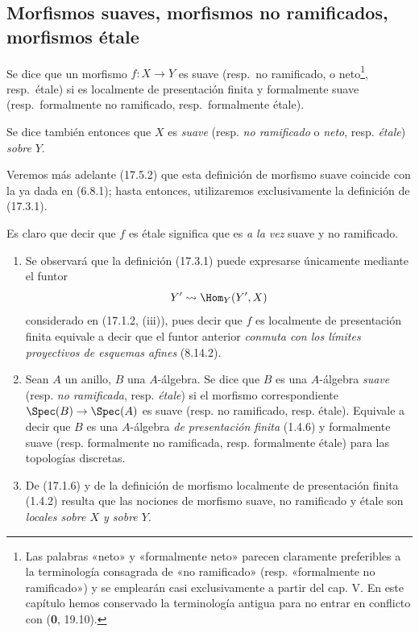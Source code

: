 \subsection{Morfismos suaves, morfismos no ramificados, morfismos étale}
\label{subsection:IV.17.3}

\begin{definition}[17.3.1]
\label{IV.17.3.1}
Se dice que un morfismo $f:X\to Y$ es suave \textup{(resp.}\ no ramificado, \textup{o} neto\footnote{Las palabras «neto» y «formalmente neto» parecen claramente preferibles a la terminología consagrada de «no ramificado» (resp. «formalmente no ramificado») y se emplearán casi exclusivamente a partir del cap. V. En este capítulo hemos conservado la terminología antigua para no entrar en conflicto con (\textbf 0, 19.10).}, \textup{resp.}\ étale\textup{)} si es localmente de presentación finita y formalmente suave \textup{(resp.}\ formalmente no ramificado, \textup{resp.}\ formalmente étale\textup{)}.
\end{definition}

Se dice también entonces que $X$ es \emph{suave} (resp. \emph{no ramificado} o \emph{neto}, resp. \emph{étale}) \emph{sobre} $Y$.

Veremos más adelante (17.5.2) que esta definición de morfismo suave coincide con la ya dada en (6.8.1); hasta entonces, utilizaremos exclusivamente la definición de (17.3.1).

Es claro que decir que $f$ es étale significa que es \emph{a la vez} suave y no ramificado.

\begin{remarks}[17.3.2]
\label{IV.17.3.2}
\begin{enumerate}
  \item[(i)] Se observará que la definición (17.3.1) puede expresarse únicamente mediante el funtor
  \[
    Y'\leadsto\Hom_Y(Y',X)
  \]
  considerado en (17.1.2, (iii)), pues decir que $f$ es localmente de presentación finita equivale a decir que el funtor anterior \emph{conmuta con los límites proyectivos de esquemas afines} (8.14.2).
  \item[(ii)] Sean $A$ un anillo, $B$ una $A$-álgebra. Se dice que $B$ es una $A$-álgebra \emph{suave} (resp. \emph{no ramificada}, resp. \emph{étale}) si el morfismo correspondiente $\Spec(B)\to\Spec(A)$ es suave (resp. no ramificado, resp. étale). Equivale a decir que $B$ es una $A$-álgebra \emph{de presentación finita} (1.4.6) y formalmente suave (resp. formalmente no ramificada, resp. formalmente étale) para las topologías discretas.
  \item[(iii)] De (17.1.6) y de la definición de morfismo localmente de presentación finita (1.4.2) resulta que las nociones de morfismo suave, no ramificado y étale son \emph{locales sobre $X$ y sobre $Y$}.
\end{enumerate}
\end{remarks}

